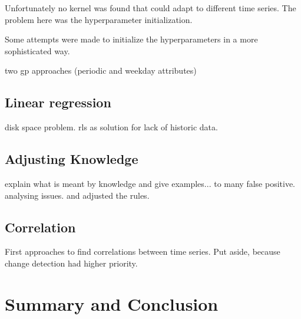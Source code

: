 \documentclass[]{article}
\begin{document}

Unfortunately no kernel was found that could adapt to different time series.
The problem here was the hyperparameter initialization.

Some attempts were made to initialize the hyperparameters in a more sophisticated way.








two gp approaches (periodic and weekday attributes)

\subsection{Linear regression}
disk space problem. rls as solution for lack of historic data.

\subsection{Adjusting Knowledge}
explain what is meant by knowledge and give examples... to many false positive. analysing issues. and adjusted the rules.

\subsection{Correlation}
First approaches to find correlations between time series. Put aside, because change detection had higher priority.

\section{Summary and Conclusion}
\end{document}
